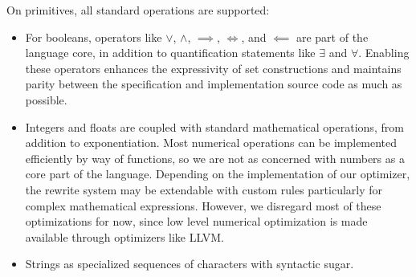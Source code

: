 \documentclass{article}
\begin{document}
On primitives, all standard operations are supported:
\begin{itemize}
  \item For booleans, operators like $\lor$, $\land$, $\implies$, $\iff$, and $\impliedby$ are part of the language core, in addition to quantification statements like $\exists$ and $\forall$. Enabling these operators enhances the expressivity of set constructions and maintains parity between the specification and implementation source code as much as possible.
  \item Integers and floats are coupled with standard mathematical operations, from addition to exponentiation. Most numerical operations can be implemented efficiently by way of functions, so we are not as concerned with numbers as a core part of the language. Depending on the implementation of our optimizer, the rewrite system may be extendable with custom rules particularly for complex mathematical expressions. However, we disregard most of these optimizations for now, since low level numerical optimization is made available through optimizers like LLVM.
  \item Strings as specialized sequences of characters with syntactic sugar.
\end{itemize}
\end{document}
